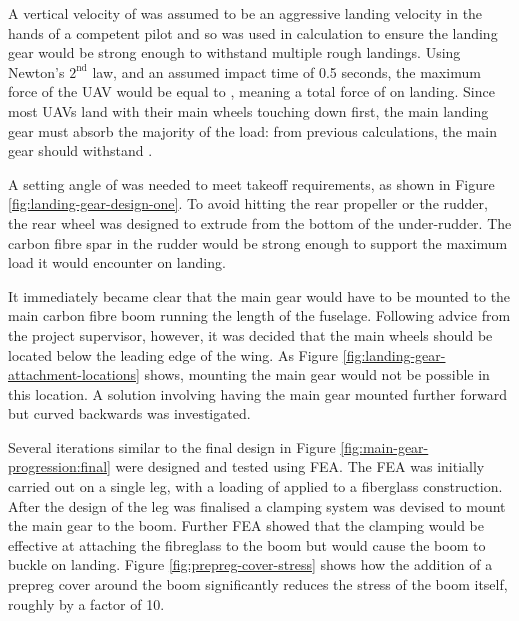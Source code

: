 \documentclass[../../main.tex]{subfiles}
\begin{document}
A vertical velocity of  was assumed to be an aggressive landing velocity in the hands of a competent pilot and so was used in calculation to ensure the landing gear would be strong enough to withstand multiple rough landings.
Using Newton's $2^\mathrm{nd}$ law, and an assumed impact time of 0.5 seconds, the maximum force of the UAV would be equal to , meaning a total force of  on landing.
Since most UAVs land with their main wheels touching down first, the main landing gear must absorb the majority of the load: from previous calculations, the main gear should withstand .  


A setting angle of  was needed to meet takeoff requirements, as shown in Figure \ref{fig:landing-gear-design-one}.
To avoid hitting the rear propeller or the rudder, the rear wheel was designed to extrude from the bottom of the under-rudder.
The carbon fibre spar in the rudder would be strong enough to support the maximum  load it would encounter on landing. 


It immediately became clear that the main gear would have to be mounted to the main carbon fibre boom running the length of the fuselage.
Following advice from the project supervisor, however, it was decided that the main wheels should be located below the leading edge of the wing.
As Figure \ref{fig:landing-gear-attachment-locations} shows, mounting the main gear would not be possible in this location.
A solution involving having the main gear mounted further forward but curved backwards was investigated.  

Several iterations similar to the final design in Figure \ref{fig:main-gear-progression:final} were designed and tested using FEA.
The FEA was initially carried out on a single leg, with a loading of  applied to a fiberglass construction.
After the design of the leg was finalised a clamping system was devised to mount the main gear to the boom.
Further FEA showed that the clamping would be effective at attaching the fibreglass to the boom but would cause the boom to buckle on landing.
Figure \ref{fig:prepreg-cover-stress} shows how the addition of a prepreg cover around the boom significantly reduces the stress of the boom itself, roughly by a factor of 10. 
\end{document}

